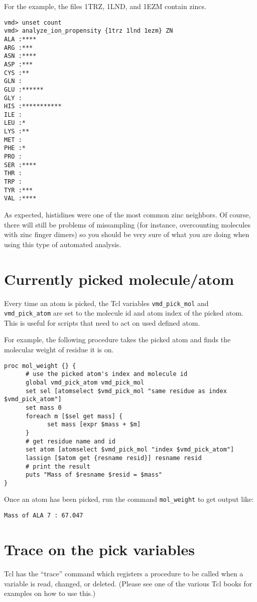    For the example, the files 1TRZ, 1LND, and 1EZM contain zincs.

\begin{verbatim}
vmd> unset count
vmd> analyze_ion_propensity {1trz 1lnd 1ezm} ZN
ALA :****
ARG :***
ASN :****
ASP :***
CYS :**
GLN :
GLU :******
GLY :
HIS :***********
ILE :
LEU :*
LYS :**
MET :
PHE :*
PRO :
SER :****
THR :
TRP :
TYR :***
VAL :****
\end{verbatim}

  As expected, histidines were one of the most common zinc
neighbors. Of course, there will still be problems of missampling (for
instance, overcounting molecules with zinc finger dimers) so you
should be very sure of what you are doing when using this type of
automated analysis.

\section{Currently picked molecule/atom}

Every time an atom is picked, the Tcl variables {\tt vmd\_pick\_mol} and
{\tt vmd\_pick\_atom} 
are set to the molecule id and atom index of the picked
atom.  This is useful for scripts that need to act on used defined
atom.

For example, the following procedure takes the picked atom and
finds the molecular weight of residue it is on.

\begin{verbatim}
proc mol_weight {} {
      # use the picked atom's index and molecule id
      global vmd_pick_atom vmd_pick_mol
      set sel [atomselect $vmd_pick_mol "same residue as index $vmd_pick_atom"]
      set mass 0
      foreach m [$sel get mass] {
            set mass [expr $mass + $m]
      }
      # get residue name and id
      set atom [atomselect $vmd_pick_mol "index $vmd_pick_atom"]
      lassign [$atom get {resname resid}] resname resid
      # print the result
      puts "Mass of $resname $resid = $mass"
}
\end{verbatim}
      Once an atom has been picked, run the command {\tt mol\_weight}
to get output like:
\begin{verbatim}
Mass of ALA 7 : 67.047
\end{verbatim}

\section{Trace on the pick variables}
Tcl has the ``trace'' command which registers a procedure to be called
when a variable is read, changed, or deleted.  (Please see one of
the various Tcl books for examples on how to use this.)

